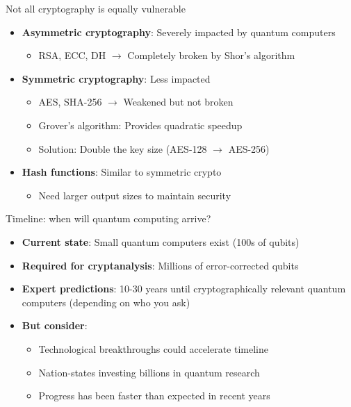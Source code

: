 \documentclass[aspectratio=169, lualatex, handout]{beamer}
\begin{document}
\begin{frame}{Not all cryptography is equally vulnerable}
	\begin{itemize}
		\item \textbf{Asymmetric cryptography}: Severely impacted by quantum computers
		      \begin{itemize}
			      \item RSA, ECC, DH $\rightarrow$ Completely broken by Shor's algorithm
		      \end{itemize}
		\item \textbf{Symmetric cryptography}: Less impacted
		      \begin{itemize}
			      \item AES, SHA-256 $\rightarrow$ Weakened but not broken
			      \item Grover's algorithm: Provides quadratic speedup
			      \item Solution: Double the key size (AES-128 $\rightarrow$ AES-256)
		      \end{itemize}
		\item \textbf{Hash functions}: Similar to symmetric crypto
		      \begin{itemize}
			      \item Need larger output sizes to maintain security
		      \end{itemize}
	\end{itemize}
\end{frame}

\begin{frame}{Timeline: when will quantum computing arrive?}
	\begin{itemize}
		\item \textbf{Current state}: Small quantum computers exist (100s of qubits)
		\item \textbf{Required for cryptanalysis}: Millions of error-corrected qubits
		\item \textbf{Expert predictions}: 10-30 years until cryptographically relevant quantum computers (depending on who you ask)
		\item \textbf{But consider}:
		      \begin{itemize}
			      \item Technological breakthroughs could accelerate timeline
			      \item Nation-states investing billions in quantum research
			      \item Progress has been faster than expected in recent years
		      \end{itemize}
	\end{itemize}
\end{frame}
\end{document}
